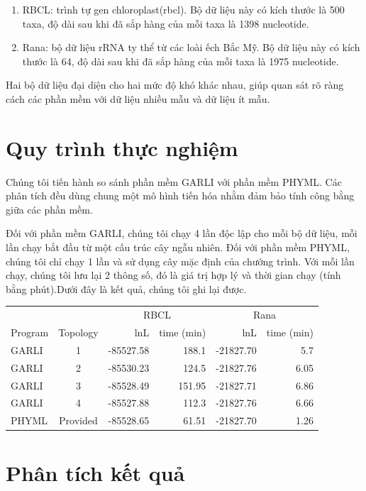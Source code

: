 \documentclass[12pt,a4paper]{report}
\begin{document}
\begin{enumerate}
    \item RBCL: trình tự gen chloroplast(rbcl). Bộ dữ liệu này có kích thước là 500 taxa, độ dài sau khi đã sắp hàng của mỗi taxa là 1398 nucleotide.
    \item Rana: bộ dữ liệu rRNA ty thể từ các loài ếch Bắc Mỹ. Bộ dữ liệu này có kích thước là 64, độ dài sau khi đã sắp hàng của mỗi taxa là 1975 nucleotide. 
\end{enumerate}

Hai bộ dữ liệu đại diện cho hai mức độ khó khác nhau, giúp quan sát rõ ràng cách các phần mềm với dữ liệu nhiều mẫu và dữ liệu ít mẫu.

\section{Quy trình thực nghiệm}

Chúng tôi tiến hành so sánh phần mềm GARLI với phần mềm PHYML. Các phân tích đều dùng chung một mô hình tiến hóa nhằm đảm bảo tính công bằng giữa các phần mềm.

Đối với phần mềm GARLI, chúng tôi chạy 4 lần độc lập cho mỗi bộ dữ liệu, mỗi lần chạy bắt đầu từ một cấu trúc cây ngẫu nhiên. Đối với phần mềm PHYML, chúng tôi chỉ chạy 1 lần và sử dụng cây mặc định của chướng trình. Với mỗi lần chạy, chúng tôi lưu lại 2 thông số, đó là giá trị hợp lý và thời gian chạy (tính bằng phút).Dưới đây là kết quả, chúng tôi ghi lại được.

\begin{table}[h!]
\centering
\begin{tabular}{l c r r  r r}
\toprule
 & & \multicolumn{2}{c}{RBCL} & \multicolumn{2}{c}{Rana} \\
Program & Topology & lnL & time (min) & lnL & time (min) \\
\midrule
GARLI & 1 & -85527.58 & 188.1 & -21827.70 & 5.7 \\
GARLI & 2 & -85530.23 & 124.5 & -21827.76 & 6.05 \\
GARLI & 3 & -85528.49 & 151.95 & -21827.71 & 6.86 \\
GARLI & 4 & -85527.88 & 112.3 & -21827.76 & 6.66 \\
PHYML & Provided & -85528.65 & 61.51 & -21827.70 & 1.26 \\
\bottomrule
\end{tabular}
\end{table}

\section{Phân tích kết quả}
\end{document}
